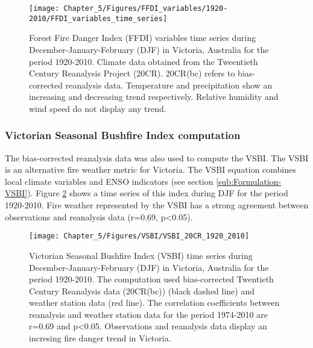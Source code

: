 \begin{figure}[H]
\noindent \begin{centering}
\texttt{[image: Chapter\_5/Figures/FFDI\_variables/1920-2010/FFDI\_variables\_time\_series]}
\par\end{centering}

\caption[Forest Fire Danger Index (FFDI) variables time series during December-January-February
(DJF) in Victoria, Australia for the period 1920-2010]{Forest Fire Danger Index (FFDI) variables time series during December-January-February
(DJF) in Victoria, Australia for the period 1920-2010. Climate data
obtained from the Tweentieth Century Reanalysis Project (20CR). 20CR(bc)
refers to bias-corrected reanalysis data. Temperature and precipitation
show an increasing and decreasing trend respectively. Relative humidity
and wind speed do not display any trend. \label{fig:Forest Fire Danger Index (FFDI) variables time series during December-January-February in Victoria, Australia for the period 1920-2010}}


\end{figure}



\subsubsection{Victorian Seasonal Bushfire Index computation}

The bias-corrected reanalysis data was also used to compute the VSBI.
The VSBI is an alternative fire weather metric for Victoria. The VSBI
equation combines local climate variables and ENSO indicators (see
section \ref{sub:Formulation-VSBI}). Figure \ref{fig:Victorian Seasonal Bushfire Index time series during December-January-February in Victoria, Australia for the period 1920-2010}
shows a time series of this index during DJF for the period 1920-2010.
Fire weather represented by the VSBI has a strong agreement between
observations and reanalysis data (r=0.69, p<0.05).

\begin{figure}[h]
\noindent \begin{centering}
\texttt{[image: Chapter\_5/Figures/VSBI/VSBI\_20CR\_1920\_2010]}
\par\end{centering}

\caption[Victorian Seasonal Bushfire Index (VSBI) time series during December-January-February
(DJF) in Victoria, Australia for the period 1920-2010]{Victorian Seasonal Bushfire Index (VSBI) time series during December-January-February
(DJF) in Victoria, Australia for the period 1920-2010. The computation
used bias-corrected Twentieth Century Reanalysis data (20CR(bc)) (black
dashed line) and weather station data (red line). The correlation
coefficients between reanalysis and weather station data for the period
1974-2010 are r=0.69 and p<0.05. Observations and reanalysis data
display an incresing fire danger trend in Victoria. \label{fig:Victorian Seasonal Bushfire Index time series during December-January-February in Victoria, Australia for the period 1920-2010} }
\end{figure}


